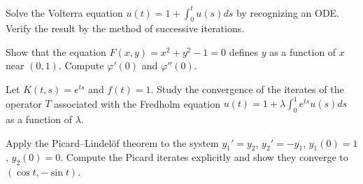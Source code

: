 \begin{exercise}
Solve the Volterra equation $u(t) = 1 + \int_0^t u(s) ds$ by recognizing an ODE. Verify
the result by the method of successive iterations.
\end{exercise}

\begin{exercise}
Show that the equation $F(x, y) = x^2 + y^2 - 1 = 0$ defines $y$ as a function of $x$
near $(0, 1)$. Compute $\varphi'(0)$ and $\varphi''(0)$.
\end{exercise}

\begin{exercise}
Let $K(t,s) = e^{ts}$ and $f(t) = 1$. Study the convergence of the iterates of the
operator $T$ associated with the Fredholm equation
$u(t) = 1 + \lambda \int_0^1 e^{ts} u(s) ds$ as a function of $\lambda$.
\end{exercise}

\begin{exercise}
Apply the Picard--Lindel\"of theorem to the system $y_1' = y_2$, $y_2' = -y_1$,
$y_1(0) = 1$, $y_2(0) = 0$. Compute the Picard iterates explicitly and show they converge
to $(\cos t, -\sin t)$.
\end{exercise}
